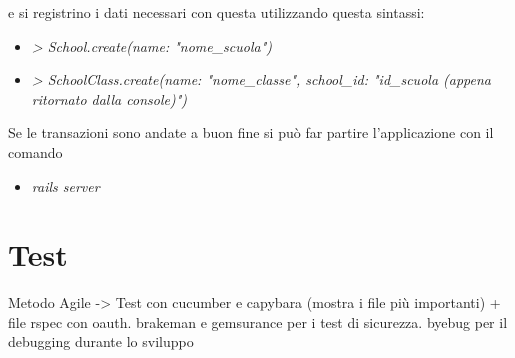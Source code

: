 \documentclass[Lau, binding=0.6cm, oneside]{sapthesis}
\begin{document}
e si registrino i dati necessari con questa utilizzando questa sintassi:
\begin{itemize}
	\item \textit{> School.create(name: "nome\_scuola")}
	\item \textit{> SchoolClass.create(name: "nome\_classe", school\_id: "id\_scuola (appena ritornato dalla console)")}
\end{itemize}

Se le transazioni sono andate a buon fine si può far partire l'applicazione con il comando 
\begin{itemize}
	\item \textit{rails server}
\end{itemize}

\section{Test}

Metodo Agile -> Test con cucumber e capybara (mostra i file più importanti) + file rspec con oauth. brakeman e gemsurance per i test di sicurezza. byebug per il debugging durante lo sviluppo 
\end{document}
